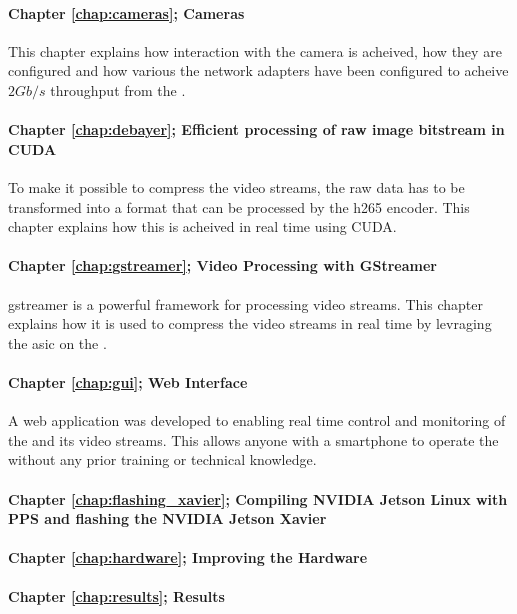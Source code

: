 \paragraph{Chapter \ref{chap:cameras}; Cameras}
This chapter explains how interaction with the camera is acheived, how they are configured and how various the network adapters have been configured to acheive $2Gb/s$ throughput from the \cams.

\paragraph{Chapter \ref{chap:debayer}; Efficient processing of raw image bitstream in CUDA}
To make it possible to compress the video streams, the raw data has to be transformed into a format that can be processed by the \gls{h265} encoder.
This chapter explains how this is acheived in real time using CUDA.

\paragraph{Chapter \ref{chap:gstreamer}; Video Processing with GStreamer}
\gls{gstreamer} is a powerful framework for processing video streams.
This chapter explains how it is used to compress the video streams in real time by levraging the \gls{asic} on the \jx.

\paragraph{Chapter \ref{chap:gui}; Web Interface}
A web application was developed to enabling real time control and monitoring of the \sr and its video streams.
This allows anyone with a smartphone to operate the \sr without any prior training or technical knowledge.


\paragraph{Chapter \ref{chap:flashing_xavier}; Compiling NVIDIA Jetson Linux with PPS and flashing the NVIDIA Jetson Xavier}
\paragraph{Chapter \ref{chap:hardware}; Improving the Hardware}
\paragraph{Chapter \ref{chap:results}; Results}
